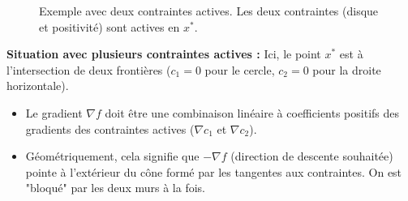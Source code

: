 \begin{figure}[H]
\centering
{}
\caption{Exemple avec deux contraintes actives. Les deux contraintes (disque et positivité) sont actives en $x^*$.}
\label{fig:ex-two-inequalities}
\end{figure}

\begin{figureexplanation}
\textbf{Situation avec plusieurs contraintes actives :}
Ici, le point $x^*$ est à l'intersection de deux frontières ($c_1=0$ pour le cercle, $c_2=0$ pour la droite horizontale).
\begin{itemize}
    \item Le gradient $\nabla f$ doit être une combinaison linéaire à coefficients positifs des gradients des contraintes actives ($\nabla c_1$ et $\nabla c_2$).
    \item Géométriquement, cela signifie que $-\nabla f$ (direction de descente souhaitée) pointe à l'extérieur du cône formé par les tangentes aux contraintes. On est "bloqué" par les deux murs à la fois.
\end{itemize}
\end{figureexplanation}

